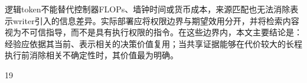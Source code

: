 \documentclass[sigconf,anonymous,review]{acmart}
\theoremstyle{zhplain}
\begin{document}
逻辑token不能替代控制器FLOPs、墙钟时间或货币成本，来源匹配也无法消除表示writer引入的信息差异。实际部署应将权限边界与期望效用分开，并将检索内容视为不可信指导，而不是具有执行权限的指令。在这些边界内，本文主要结论是：经验应依据其当前、表示相关的决策价值复用；当共享证据能够在代价较大的长程执行前消除相关不确定性时，其价值最为明确。


\label{maintext:end}
\clearpage

\begin{thebibliography}{19}


\ifx \showCODEN    \undefined {}     \fi
\ifx \showISBNx    \undefined \def \showISBNx     #1{\unskip}     \fi
\ifx \showISBNxiii \undefined \def \showISBNxiii  #1{\unskip}     \fi
\ifx \showISSN     \undefined \def \showISSN      #1{\unskip}     \fi
\ifx \showLCCN     \undefined \def \showLCCN      #1{\unskip}     \fi
\ifx \shownote     \undefined \def \shownote      #1{#1}          \fi
\ifx \showarticletitle \undefined \def \showarticletitle #1{#1}   \fi
\ifx \showURL      \undefined \def \showURL       {\relax}        \fi
\providecommand\bibfield[2]{#2}
\providecommand\bibinfo[2]{#2}
\providecommand\natexlab[1]{#1}
\providecommand\showeprint[2][]{arXiv:#2}
\makeatletter
{}
\makeatother


\end{thebibliography}
\end{document}
